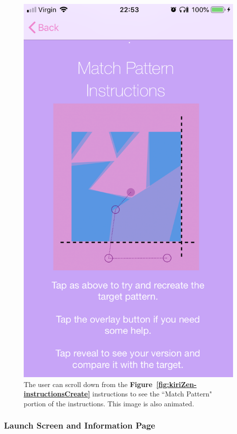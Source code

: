 \documentclass[11pt]{article}
\begin{document}
\begin{figure}[!ht]
\begin{minipage}{0.45\textwidth}
                                    \includegraphics[width=0.7\linewidth]{KiriZen/instructionsMatch.png}
                                    \caption{The user can scroll down from the  \textbf{Figure~\ref{fig:kiriZen-instructionsCreate}} instructions to see the ``Match Pattern" portion of the instructions. This image is also animated.}
                                    \label{fig:kiriZen-instructionsMatch}
                                \end{minipage}
                            \end{figure}


                 \subsubsection{Launch Screen and Information Page}
\end{document}
